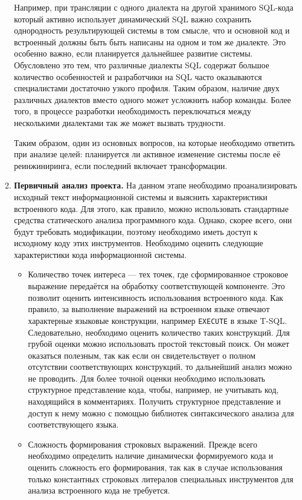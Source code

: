 \begin{enumerate}
  Например, при трансляции с одного диалекта на другой хранимого SQL-кода который активно использует динамический SQL важно сохранить однородность результирующей системы в том смысле, что и основной код и встроенный должны быть быть написаны на одном и том же диалекте. Это особенно важно, если планируется дальнейшее развитие системы. Обусловлено это тем, что различные диалекты SQL содержат большое количество особенностей и разработчики на SQL часто оказываются специалистами достаточно узкого профиля. Таким образом, наличие двух различных диалектов вместо одного может усложнить набор команды. Более того, в процессе разработки необходимость переключаться между несколькими диалектами так же может вызвать трудности.
  
  Таким образом, один из основных вопросов, на которые необходимо ответить при анализе целей: планируется ли активное изменение системы после её реинжиниринга, если последний включает трансформации.
  
  \item \textbf{Первичный анализ проекта.} На данном этапе необходимо проанализировать исходный текст информационной системы и выяснить характеристики встроенного кода. Для этого, как правило, можно использовать стандартные средства статического анализа программного кода. Однако, скорее всего, они будут требовать модификации, поэтому необходимо иметь доступ к исходному коду этих инструментов. Необходимо оценить следующие характеристики кода информационной системы.
  \begin{itemize}
    \item Количество точек интереса --- тех точек, где сформированное строковое выражение передаётся на обработку соответствующей компоненте. Это позволит оценить интенсивность использования встроенного кода. Как правило, за выполнение выражений на встроенном языке отвечают характерные языковые конструкции, например \verb|EXECUTE| в языке T-SQL. Следовательно, необходимо оценить количество таких конструкций. Для грубой оценки можно использовать простой текстовый поиск. Он может оказаться полезным, так как если он свидетельствует о полном отсутствии соответствующих конструкций, то дальнейший анализ можно не проводить. Для более точной оценки необходимо использовать структурное представление кода, чтобы, например, не учитывать код, находящийся в комментариях. Получить структурное представление и доступ к нему можно с помощью библиотек синтаксического анализа для соответствующего языка.
    
    \item Сложность формирования строковых выражений. Прежде всего необходимо определить наличие динамически формируемого кода и оценить сложность его формирования, так как в случае использования только константных строковых литералов специальных инструментов для анализа встроенного кода не требуется.
    

\end{itemize}
\end{enumerate}
